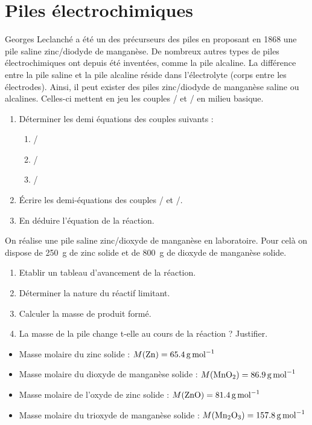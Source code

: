 \documentclass[a4paper,fontsize=14pt,fleqn]{scrartcl}%
\begin{document}
\newpage
\section{Piles électrochimiques}
Georges Leclanché a été un des précurseurs des piles en proposant en 1868 une pile saline zinc/diodyde de manganèse. De nombreux autres types de piles électrochimiques ont depuis été inventées, comme la pile alcaline. La différence entre la pile saline et la pile alcaline réside dans l'électrolyte (corps entre les électrodes). Ainsi, il peut exister des piles zinc/diodyde de manganèse saline ou alcalines. Celles-ci mettent en jeu les couples / et / en milieu basique.

\begin{enumerate}
    \item Déterminer les demi équations des couples suivants : \begin{enumerate}
        \item {}/
        \item {}/
        \item {}/
    \end{enumerate}
    \item Écrire les demi-équations des couples / et /.
    \item En déduire l'équation de la réaction.
\end{enumerate}

On réalise une pile saline zinc/dioxyde de manganèse en laboratoire. Pour celà on dispose de \SI{250}{g} de zinc solide et de \SI{800}{g} de dioxyde de manganèse solide.
\begin{enumerate}[resume]
    \item Etablir un tableau d'avancement de la réaction.
    \item Déterminer la nature du réactif limitant.
    \item Calculer la masse de produit formé.
    \item La masse de la pile change t-elle au cours de la réaction ? Justifier.
\end{enumerate}

\begin{data}
    \begin{itemize}
        \item Masse molaire du zinc solide : $M(\ce{Zn}) = \SI{65,4}{\gram\per\mole}$
        \item Masse molaire du dioxyde de manganèse solide : $M(\ce{MnO2}) = \SI{86,9}{\gram\per\mole}$
        \item Masse molaire de l'oxyde de zinc solide : $M(\ce{ZnO}) = \SI{81,4}{\gram\per\mole}$
        \item Masse molaire du trioxyde de manganèse solide : $M(\ce{Mn2O3}) = \SI{157,8}{\gram\per\mole}$
    \end{itemize}
\end{data}
\end{document}
